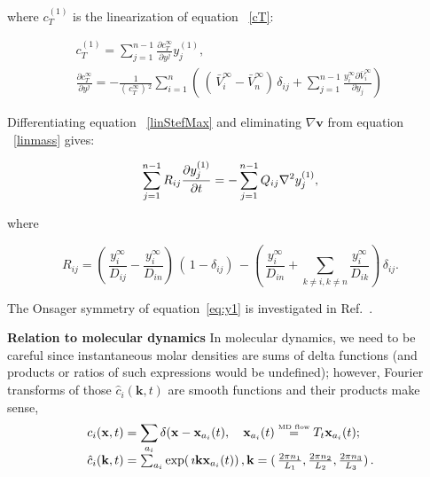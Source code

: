 \documentclass[../main.tex]{subfiles}
\begin{document}
\noindent where $c_T^{(1)}$ is the linearization of equation ~\ref{cT}:

\begin{equation} \begin{array}{l}
    \displaystyle c_T^{(1)}  =    \displaystyle \sum_{j=1}^{n-1} \frac{\partial c_T^{\infty}}{\partial y^j} y_j^{(1)},
    \\
    \displaystyle \frac{\partial c_T^{\infty}}{\partial y^j} = -\frac{1}{( \, c_T^{\infty}) \,^2}  \sum_{i=1}^{n} ( \, ( \,  \bar{V}_i^{\infty} - \bar{V}_n^{\infty} ) \,  \delta_{ij} + \sum_{j=1}^{n-1}  \frac{ y_i^{\infty}\partial  \bar{V}_i^{\infty} }{\partial  y_j}) \,
\end{array} \end{equation}

Differentiating equation ~\ref{linStefMax} and eliminating $\nabla \mathbf{v}$ from equation ~\ref{linmass} gives:

\begin{equation}
    \displaystyle\displaystyle \sum_{j=1}^{n-1} R_{ij} \frac{\partial  y_j^{(1)}}{\partial t}= - \sum_{j=1}^{n-1} Q_{ij} \nabla^2 y_j^{(1)},
    \label{eq:y1}
\end{equation}

\noindent where

\begin{equation}
    \displaystyle R_{ij} = ( \, \frac{ y_i^{\infty}}{D_{ij}} - \frac{ y_i^{\infty}}{D_{in}} ) \, ( \, 1-\delta_{ij}) \,  - ( \, \frac{ y_i^{\infty}}{D_{in}} + \sum_{k\neq i,k\neq n} \frac{ y_i^{\infty}}{D_{ik}}   ) \,  \delta_{ij}.
\end{equation}


The Onsager symmetry
of equation~\ref{eq:y1} is investigated in Ref.~.

\textbf{Relation to molecular dynamics}
In molecular dynamics, we need to be careful since instantaneous molar densities are sums of delta functions (and products or ratios of such expressions would be  undefined); however, Fourier transforms of those $ \hat{c}_i (\mathbf{k},t) $ are smooth functions and their products make sense,
\begin{equation} \begin{array}{l}
    c_i (\mathbf{x},t) = \displaystyle \sum_{a_i} \delta (\mathbf{x}- \mathbf{x}_{a_i}(t), \quad \mathbf{x}_{a_i}(t)  \stackrel{\mbox{\tiny MD flow}}{=}   T_t   \mathbf{x}_{a_i}(t) ;
    \\
    \hat{c}_i (\mathbf{k},t) =  \sum_{a_i} \exp ( \, \imath \mathbf{k} \mathbf{x}_{a_i}(t) ) \, , \mathbf{k} = ( \,  \frac{2 \pi n_1}{L_1},  \frac{2 \pi n_2}{L_2}, \frac{2 \pi n_3}{L_3} ) \,.
\end{array} \end{equation}
\end{document}
